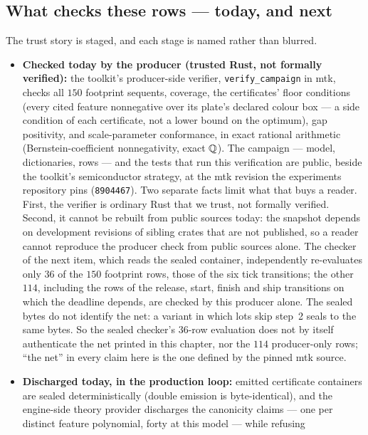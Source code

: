 \subsection{What checks these rows --- today, and next}
\label{sec:minifab-exact-status}

The trust story is staged, and each stage is named rather than
blurred.

\begin{itemize}
\item \textbf{Checked today by the producer (trusted Rust, not
  formally verified):} the toolkit's producer-side verifier,
  \texttt{verify\_campaign} in mtk, checks all $150$ footprint
  sequents, coverage, the certificates' floor conditions (every cited
  feature nonnegative over its plate's declared colour box --- a
  side condition of each certificate, not a lower bound on the
  optimum), gap positivity, and scale-parameter
  conformance, in exact rational arithmetic (Bernstein-coefficient
  nonnegativity, exact $\mathbb{Q}$). The campaign --- model, dictionaries,
  rows --- and the tests that run this verification are public, beside
  the toolkit's semiconductor strategy, at the mtk revision the
  experiments repository pins (\texttt{8904467}). Two
  separate facts limit what that buys a reader. First, the verifier
  is ordinary Rust that we trust, not formally verified. Second, it cannot
  be rebuilt from public sources today: the snapshot depends on
  development revisions of sibling crates that are not published, so
  a reader cannot reproduce the producer check from public sources
  alone. The checker of the next item, which
  reads the sealed container, independently re-evaluates only $36$ of the $150$ footprint rows,
  those of the six tick transitions; the other $114$, including the
  rows of the release, start, finish and ship transitions on which
  the deadline depends, are checked by this producer alone. The
  sealed bytes do not identify the net: a variant in which lots skip
  step~2 seals to the same bytes. So the sealed checker's $36$-row
  evaluation does not by itself authenticate the net printed in this
  chapter, nor the $114$ producer-only rows; ``the net'' in every
  claim here is the one defined by the pinned mtk source.
\item \textbf{Discharged today, in the production loop:} emitted
  certificate containers are sealed deterministically (double
  emission is byte-identical), and the engine-side theory provider
  discharges the canonicity claims --- one per distinct feature
  polynomial, forty at this model --- while refusing

\end{itemize}
